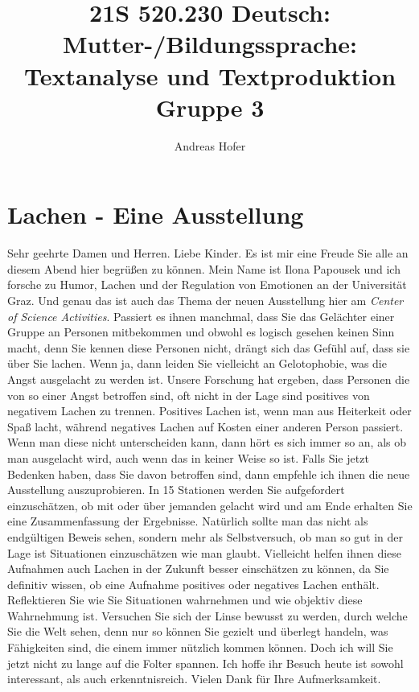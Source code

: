 \documentclass{article}
\title{\vspace{-3cm}21S 520.230 Deutsch: Mutter-/Bildungssprache: Textanalyse und Textproduktion Gruppe 3}
\author{Andreas Hofer}
\begin{document}
	\section*{Lachen - Eine Ausstellung}
	\large
	Sehr geehrte Damen und Herren. Liebe Kinder. Es ist mir eine Freude Sie alle an diesem Abend hier begrüßen zu können. Mein Name ist Ilona Papousek und ich forsche zu Humor, Lachen und der Regulation von Emotionen an der Universität Graz. Und genau das ist auch das Thema der neuen Ausstellung hier am \textit{Center of Science Activities}. Passiert es ihnen manchmal, dass Sie das Gelächter einer Gruppe an Personen mitbekommen und obwohl es logisch gesehen keinen Sinn macht, denn Sie kennen diese Personen nicht, drängt sich das Gefühl auf, dass sie über Sie lachen. Wenn ja, dann leiden Sie vielleicht an Gelotophobie, was die Angst ausgelacht zu werden ist. Unsere Forschung hat ergeben, dass Personen die von so einer Angst betroffen sind, oft nicht in der Lage sind positives von negativem Lachen zu trennen. Positives Lachen ist, wenn man aus Heiterkeit oder Spaß lacht, während negatives Lachen auf Kosten einer anderen Person passiert. Wenn man diese nicht unterscheiden kann, dann hört es sich immer so an, als ob man ausgelacht wird, auch wenn das in keiner Weise so ist. Falls Sie jetzt Bedenken haben, dass Sie davon betroffen sind, dann empfehle ich ihnen die neue Ausstellung auszuprobieren. In 15 Stationen werden Sie aufgefordert einzuschätzen, ob mit oder über jemanden gelacht wird und am Ende erhalten Sie eine Zusammenfassung der Ergebnisse. Natürlich sollte man das nicht als endgültigen Beweis sehen, sondern mehr als Selbstversuch, ob man so gut in der Lage ist Situationen einzuschätzen wie man glaubt. Vielleicht helfen ihnen diese Aufnahmen auch Lachen in der Zukunft besser einschätzen zu können, da Sie definitiv wissen, ob eine Aufnahme positives oder negatives Lachen enthält. Reflektieren Sie wie Sie Situationen wahrnehmen und wie objektiv diese Wahrnehmung ist. Versuchen Sie sich der Linse bewusst zu werden, durch welche Sie die Welt sehen, denn nur so können Sie gezielt und überlegt handeln, was Fähigkeiten sind, die einem immer nützlich kommen können. Doch ich will Sie jetzt nicht zu lange auf die Folter spannen. Ich hoffe ihr Besuch heute ist sowohl interessant, als auch erkenntnisreich. Vielen Dank für Ihre Aufmerksamkeit.







	
\end{document}
